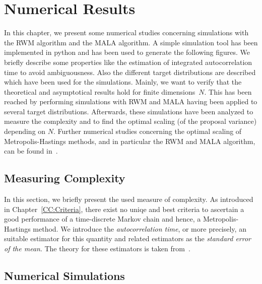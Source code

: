 \chapter{Numerical Results}
\label{Numerical Results}

In this chapter, we  present some numerical studies concerning simulations with the RWM algorithm and the MALA algorithm. A simple simulation tool has been implemented in python and has been used to generate the following figures. We  briefly describe some properties like the estimation of integrated autocorrelation time to avoid ambiguousness. Also the different target distributions are described which have been used for the simulations. Mainly, we want to verify that the theoretical and asymptotical results hold for finite dimensions~$N$. This has been reached by performing simulations with RWM and MALA having been applied to several target distributions. Afterwards, these simulations have been analyzed to measure the complexity and to find the optimal scaling (of the proposal variance) depending on $N$.
Further numerical studies concerning the optimal scaling of Metropolis-Hastings methods, and in particular the RWM and MALA algorithm, can be found in~\autocite{Beskos2008, Gelman1996, Roberts2001}.

\section{Measuring Complexity}
\label{NR- autocorrelation time}

In this section, we briefly present the used measure of complexity. As introduced in Chapter~\ref{CC:Criteria}, there exist no uniqe and best criteria to ascertain a good performance of a time-discrete Markov chain and hence, a Metropolis-Hastings method. We  introduce the \textit{autocorrelation time}, or more precisely, an suitable estimator for this quantity and related estimators as the \textit{standard error of the mean}. The theory for these estimators is taken from~\autocite{Geyer1992}.





\section{Numerical Simulations}

